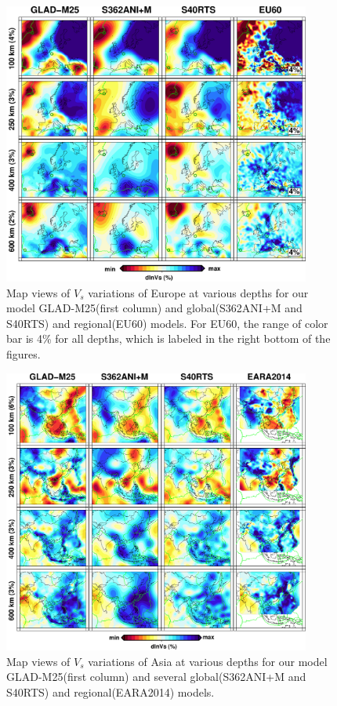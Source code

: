\documentclass[extra,mreferee]{gji}
\begin{document}
\begin{figure}
\includegraphics[width=0.9\textwidth]{figures/depth_slice/europe_vs.pdf}
  \caption{Map views of $V_s$ variations of Europe at various depths for our model GLAD-M25(first column) and global(S362ANI+M and S40RTS) and regional(EU60\citep{zhu2015seismic}) models. For EU60, the range of color bar is 4\% for all depths, which is labeled in the right bottom of the figures.}
\label{fig:europe-vs}
\centering
\end{figure}


\begin{figure}
\includegraphics[width=0.9\textwidth]{figures/depth_slice/asia_vs.pdf}
  \caption{Map views of $V_s$ variations of Asia at various depths for our model GLAD-M25(first column) and several global(S362ANI+M and S40RTS) and regional(EARA2014\citep{chen2015multiparameter}) models.}
\label{fig:asia-vs}
\centering
\end{figure}
\end{document}
